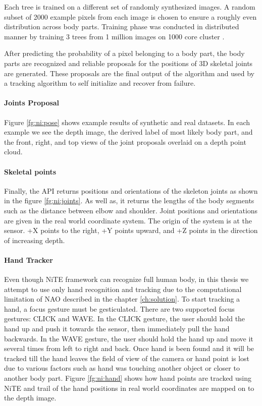 

Each tree is trained on a different set of randomly synthesized images. A random subset of 2000 example pixels from each image is chosen to ensure a roughly even distribution across body parts. Training phase was conducted in distributed manner by training 3 trees from 1 million images on 1000 core cluster \cite{13}.

After predicting the probability of a pixel belonging to a body part, the body parts are recognized and reliable proposals for the positions of 3D skeletal joints are generated. These proposals are the final output of the algorithm and used by a tracking algorithm to self initialize and recover from failure.



\paragraph*{Joints Proposal} Figure \ref{fg:ni:pose} shows example results of synthetic and real datasets. In each example we see the depth image, the derived label of most likely body part, and the front, right, and top views of the joint proposals overlaid on a depth point cloud.

\paragraph*{Skeletal points} Finally, the API returns positions and orientations of the skeleton joints as shown in the figure \ref{fg:ni:joints}. As well as, it returns the lengths of the body segments such as the distance between elbow and shoulder. Joint positions and orientations are given in the real world coordinate system. The origin of the system is at the sensor. +X points to the right, +Y points upward, and +Z points in the direction of increasing depth. 





\paragraph*{Hand Tracker} Even though NiTE framework can recognize full human body, in this thesis we attempt to use only hand recognition and tracking due to the computational limitation of NAO described in the chapter \ref{ch:solution}. To start tracking a hand, a focus gesture must be gesticulated. There are two supported focus gestures: CLICK and WAVE. In the CLICK gesture, the user should hold the hand up and push it towards the sensor, then immediately pull the hand backwards. In the WAVE gesture, the user should hold the hand up and move it several times from left to right and back. Once hand is been found and it will be tracked till the hand leaves the field of view of the camera or hand point is lost due to various factors such as hand was touching another object or closer to another body part. Figure \ref{fg:ni:hand} shows how hand points are tracked using NiTE and trail of the hand positions in real world coordinates are mapped on to the depth image.

